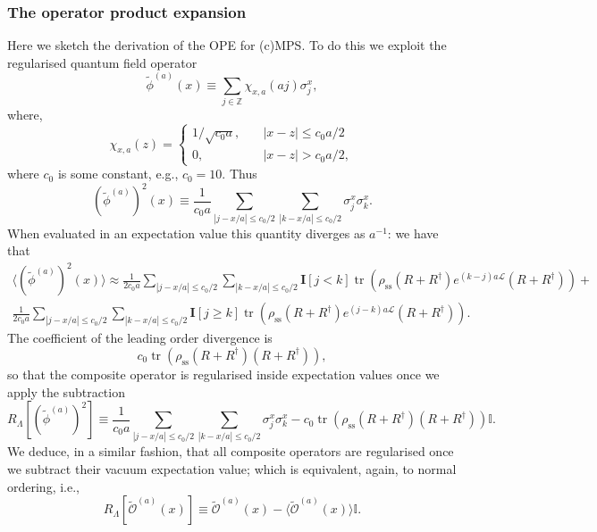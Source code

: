 \documentclass[prl,twocolumn,lengthcheck,superscriptaddress]{revtex4-1}
\newcommand{\tr}{\operatorname{tr}}
\theoremstyle{definition}
\theoremstyle{remark}
\begin{document}
\subsubsection{The operator product expansion} 
Here we sketch the derivation of the OPE for (c)MPS. To do this we exploit the regularised quantum field operator 
\begin{equation}
	\widetilde{\phi}^{(a)}(x) \equiv  \sum_{j\in\mathbb{Z}} \chi_{x,a}(aj) \sigma^x_j,
\end{equation}
where,
\begin{equation}
	\chi_{x,a}(z) = \begin{cases} 1/\sqrt{c_0a}, & \quad |x-z|\le c_0a/2 \\ 0, & \quad |x-z| > c_0a/2,\end{cases}
\end{equation}
where $c_0$ is some constant, e.g., $c_0 = 10$.
Thus
\begin{equation}
	(\widetilde{\phi}^{(a)})^2(x) \equiv \frac{1}{c_0 a} \sum_{|j-x/a|\le c_0/2}\sum_{|k-x/a|\le c_0/2} \sigma^x_j\sigma^x_k.
\end{equation}
When evaluated in an expectation value this quantity diverges as $a^{-1}$: we have that
\begin{equation}
	\begin{split}
	\langle (\widetilde{\phi}^{(a)})^2(x)\rangle \approx \frac{1}{2c_0a} \sum_{|j-x/a|\le c_0/2}\sum_{|k-x/a|\le c_0/2} \mathbf{I}[j<k]\tr\left(\rho_{\text{ss}}(R+R^\dag)e^{(k-j)a \mathcal{L}}(R+R^\dag)\right) + \\ \frac{1}{2c_0a} \sum_{|j-x/a|\le c_0/2}\sum_{|k-x/a|\le c_0/2} \mathbf{I}[j\ge k]\tr\left(\rho_{\text{ss}}(R+R^\dag)e^{(j-k)a \mathcal{L}}(R+R^\dag)\right).
	\end{split}
\end{equation}
The coefficient of the leading order divergence is 
\begin{equation}
	c_0\tr\left(\rho_{\text{ss}}(R+R^\dag)(R+R^\dag)\right),
\end{equation}
so that the composite operator is regularised inside expectation values once we apply the subtraction
\begin{equation} 
	R_{\Lambda}[(\widetilde{\phi}^{(a)})^2] \equiv \frac{1}{c_0 a} \sum_{|j-x/a|\le c_0/2}\sum_{|k-x/a|\le c_0/2} \sigma^x_j\sigma^x_k - c_0\tr\left(\rho_{\text{ss}}(R+R^\dag)(R+R^\dag)\right)\mathbb{I}.
\end{equation}
We deduce, in a similar fashion, that all composite operators are regularised once we subtract their vacuum expectation value; which is equivalent, again, to normal ordering, i.e.,
\begin{equation} 
	R_{\Lambda}[\widetilde{\mathcal{O}}^{(a)}(x)] \equiv \widetilde{\mathcal{O}}^{(a)}(x) - \langle \widetilde{\mathcal{O}}^{(a)}(x)\rangle\mathbb{I}.
\end{equation}
\end{document}
